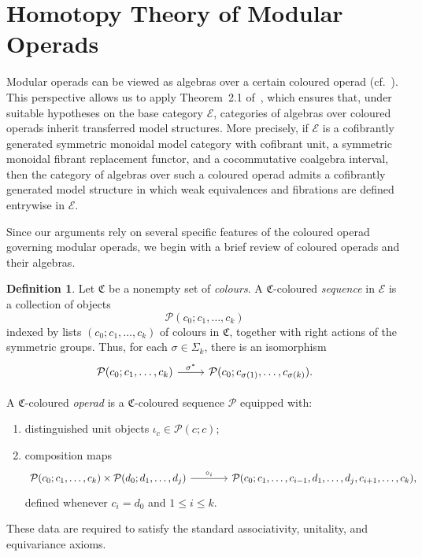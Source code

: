 \documentclass{amsart}
\newcommand{\bE}{\mathscr{E}}
\theoremstyle{definition}
\newtheorem{definition}[theorem]{Definition}%
\numberwithin{equation}{section}
\begin{document}
\section{Homotopy Theory of Modular Operads}
\label{sec: homotopy theory of mod op and truncated mod op}

Modular operads can be viewed as algebras over a certain coloured operad (cf.~\cite[Appendix~A]{dch_coextension}). This perspective allows us to apply Theorem~2.1 of~\cite{bm_resolutions}, which ensures that, under suitable hypotheses on the base category $\bE$, categories of algebras over coloured operads inherit transferred model structures. More precisely, if $\bE$ is a cofibrantly generated symmetric monoidal model category with cofibrant unit, a symmetric monoidal fibrant replacement functor, and a cocommutative coalgebra interval, then the category of algebras over such a coloured operad admits a cofibrantly generated model structure in which weak equivalences and fibrations are defined entrywise in $\bE$.

Since our arguments rely on several specific features of the coloured operad governing modular operads, we begin with a brief review of coloured operads and
their algebras.

\begin{definition}
Let $\mathfrak{C}$ be a nonempty set of \emph{colours}. A $\mathfrak{C}$-coloured \emph{sequence} in $\bE$ is a collection of objects
\[
\mathcal{P}(c_0;c_1,\ldots,c_k)
\]
indexed by lists $(c_0;c_1,\ldots,c_k)$ of colours in $\mathfrak{C}$, together with right actions of the symmetric groups. Thus, for each $\sigma\in\Sigma_k$, there is an isomorphism
\[
\begin{tikzcd}
\mathcal{P}(c_0;c_1,\ldots,c_k) \arrow[r,"\sigma^*"] & \mathcal{P}(c_0;c_{\sigma(1)},\ldots,c_{\sigma(k)}).
\end{tikzcd}
\]

A $\mathfrak{C}$-coloured \emph{operad} is a $\mathfrak{C}$-coloured sequence $\mathcal{P}$ equipped with:
\begin{enumerate}
\item distinguished unit objects $\iota_c \in \mathcal{P}(c;c)$;

    \item composition maps
    \[
    \begin{tikzcd}[column sep=large]
    \mathcal{P}(c_0;c_1,\ldots,c_k)\times \mathcal{P}(d_0;d_1,\ldots,d_j) \arrow[r,"\circ_i"] & \mathcal{P}(c_0;c_1,\ldots,c_{i-1},d_1,\ldots,d_j,c_{i+1},\ldots,c_k),
    \end{tikzcd}
    \] defined whenever $c_i=d_0$ and $1\leq i\leq k$.
\end{enumerate}
These data are required to satisfy the standard associativity, unitality, and equivariance axioms.
\end{definition}
\end{document}
